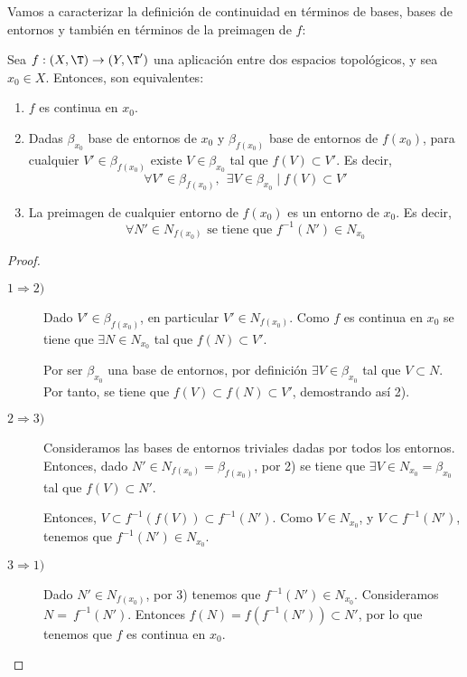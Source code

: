 Vamos a caracterizar la definición de continuidad en términos de bases, bases de entornos y también en términos de la preimagen de $f$:
\begin{prop}\label{prop:Caract_ContinuidadPto}
    Sea $f:(X,\T)\to (Y,\T')$ una aplicación entre dos espacios topológicos, y sea $x_0\in X$. Entonces, son equivalentes:
    \begin{enumerate}
        \item $f$ es continua en $x_0$.
        \item Dadas $\beta_{x_0}$ base de entornos de $x_0$ y $\beta_{f(x_0)}$ base de entornos de $f(x_0)$, para cualquier $V'\in \beta_{f(x_0)}$ existe $V\in \beta_{x_0}$ tal que $f(V)\subset V'$. Es decir,
        \begin{equation*}
            \forall V'\in \beta_{f(x_0)},~~\exists V\in \beta_{x_0} \mid f(V)\subset V'
        \end{equation*}
        \item La preimagen de cualquier entorno de $f(x_0)$ es un entorno de $x_0$. Es decir,
        \begin{equation*}
            \forall N'\in N_{f(x_0)}\text{ se tiene que } f^{-1}(N')\in N_{x_0}
        \end{equation*}
    \end{enumerate}
\end{prop}
\begin{proof}\
    \begin{description}
        \item[$1\Longrightarrow 2)$] Dado $V'\in \beta_{f(x_0)}$, en particular $V'\in N_{f(x_0)}$. Como $f$ es continua en $x_0$ se tiene que $\exists N\in N_{x_0}$ tal que $f(N)\subset V'$. 
        
        Por ser $\beta_{x_0}$ una base de entornos, por definición $\exists V\in \beta_{x_0}$ tal que $V\subset N$. Por tanto, se tiene que $f(V)\subset f(N)\subset V'$, demostrando así 2).
    
        \item[$2\Longrightarrow 3)$] Consideramos las bases de entornos triviales dadas por todos los entornos. Entonces, dado $N'\in N_{f(x_0)}=\beta_{f(x_0)}$, por 2) se tiene que $\exists V\in N_{x_0}=\beta_{x_0}$ tal que $f(V)\subset N'$.
        
        Entonces, $V\subset f^{-1}(f(V))\subset f^{-1}(N')$. Como $V\in N_{x_0}$, y $V\subset f^{-1}(N')$, tenemos que $f^{-1}(N')\in N_{x_0}$.

        \item[$3\Longrightarrow 1)$] Dado $N'\in N_{f(x_0)}$, por 3) tenemos que $f^{-1}(N')\in N_{x_0}$. Consideramos $N=~f^{-1}(N')$. Entonces $f(N)=f(f^{-1}(N'))\subset N'$, por lo que tenemos que $f$ es continua en $x_0$.
    \end{description}
\end{proof}

